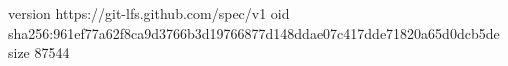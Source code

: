 version https://git-lfs.github.com/spec/v1
oid sha256:961ef77a62f8ca9d3766b3d19766877d148ddae07c417dde71820a65d0dcb5de
size 87544
